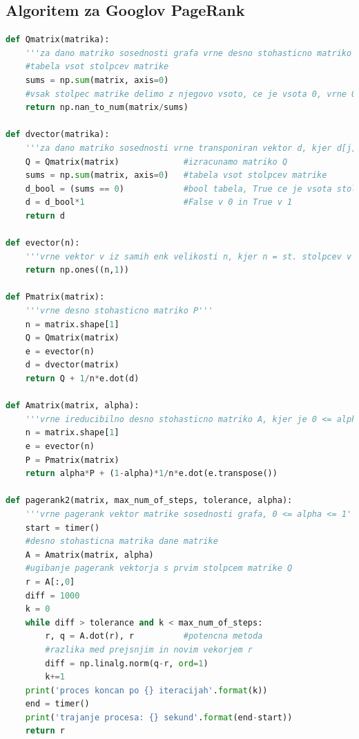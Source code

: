 \documentclass[a4paper]{article}
\begin{document}
\subsection{Algoritem za Googlov PageRank}
\begin{lstlisting}[language=Python]
def Qmatrix(matrika):
    '''za dano matriko sosednosti grafa vrne desno stohasticno matriko Q, kjer so nekateri stolpci se vedno nicelni'''
    #tabela vsot stolpcev matrike
    sums = np.sum(matrix, axis=0) 
    #vsak stolpec matrike delimo z njegovo vsoto, ce je vsota 0, vrne 0 namesto nan      
    return np.nan_to_num(matrix/sums)   

def dvector(matrika):
    '''za dano matriko sosednosti vrne transponiran vektor d, kjer d[j] = 1 ; ce #(outlinkov od j) = 0 in d[j] = 0 ; sicer'''
    Q = Qmatrix(matrix)             #izracunamo matriko Q
    sums = np.sum(matrix, axis=0)   #tabela vsot stolpcev matrike
    d_bool = (sums == 0)            #bool tabela, True ce je vsota stolpca enaka 0 in False sicer
    d = d_bool*1                    #False v 0 in True v 1
    return d

def evector(n):
    '''vrne vektor v iz samih enk velikosti n, kjer n = st. stolpcev v matriki'''
    return np.ones((n,1))    

def Pmatrix(matrix):
    '''vrne desno stohasticno matriko P'''
    n = matrix.shape[1]
    Q = Qmatrix(matrix)
    e = evector(n)
    d = dvector(matrix)
    return Q + 1/n*e.dot(d)

def Amatrix(matrix, alpha):
    '''vrne ireducibilno desno stohasticno matriko A, kjer je 0 <= alpha <= 1'''
    n = matrix.shape[1]
    e = evector(n)
    P = Pmatrix(matrix)
    return alpha*P + (1-alpha)*1/n*e.dot(e.transpose())

def pagerank2(matrix, max_num_of_steps, tolerance, alpha):
    '''vrne pagerank vektor matrike sosednosti grafa, 0 <= alpha <= 1'''
    start = timer()
    #desno stohasticna matrika dane matrike
    A = Amatrix(matrix, alpha)
    #ugibanje pagerank vektorja s prvim stolpcem matrike Q   
    r = A[:,0]  
    diff = 1000
    k = 0
    while diff > tolerance and k < max_num_of_steps:
        r, q = A.dot(r), r          #potencna metoda
        #razlika med prejsnjim in novim vekorjem r
        diff = np.linalg.norm(q-r, ord=1)   
        k+=1
    print('proces koncan po {} iteracijah'.format(k))
    end = timer()
    print('trajanje procesa: {} sekund'.format(end-start))  
    return r


\end{lstlisting}
\end{document}
